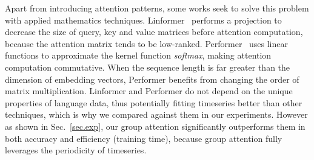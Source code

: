 
Apart from introducing attention patterns, some works seek to solve this problem with 
applied mathematics techniques. Linformer~\cite{wang2020linformer} performs a projection to decrease the size of query, key and value matrices before attention computation, because the attention matrix tends to be low-ranked. 
Performer~\cite{choromanski2020rethinking} uses linear functions to approximate the kernel function \textit{softmax}, making attention computation commutative. When the sequence length is far greater than the dimension of embedding vectors, Performer benefits from changing the order of matrix multiplication.
Linformer and Performer do not depend on the unique properties of language data, thus potentially fitting timeseries better than other techniques, which is why we compared against them in our experiments. 
However as shown in Sec.~\ref{sec.exp}, our group attention significantly outperforms them in both accuracy and efficiency (training time), because group attention fully leverages the periodicity of timeseries.  



